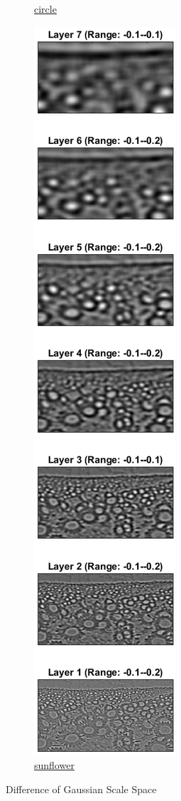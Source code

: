 \begin{figure}
\begin{subfigure}[t]{0.4\textwidth}
		\caption{\href{./hw3/problem1/DoGSSc.png}{circle}}\label{fig:12a}
	\end{subfigure}
	\qquad
	\begin{subfigure}[t]{0.4\textwidth}
	    \centering
		\includegraphics[height=0.92\textheight]{hw3/problem1/DoGSSs.png}
		\caption{\href{./hw3/problem1/DoGSSs.png}{sunflower}}\label{fig:12b}
	\end{subfigure}
	\caption{Difference of Gaussian Scale Space}\label{fig:12}
\end{figure}

